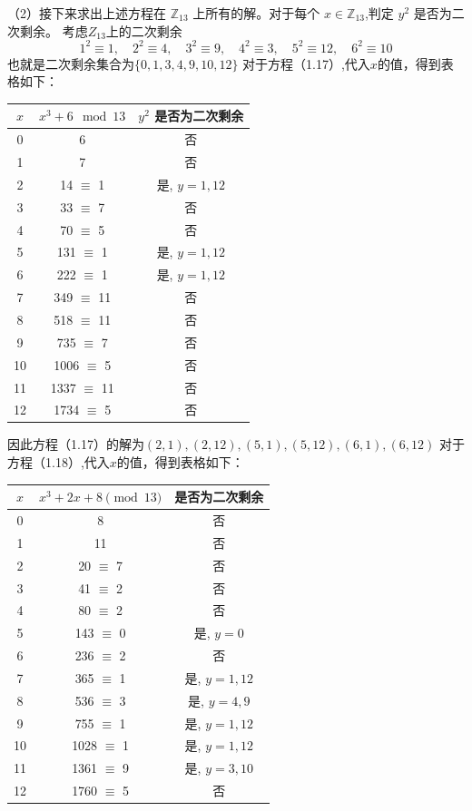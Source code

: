 \documentclass[12pt,a4paper]{article}
\begin{document}
（2）接下来求出上述方程在 $\mathbb{Z}_{13}$ 上所有的解。对于每个 $x \in \mathbb{Z}_{13}$,判定 $y^2$ 是否为二次剩余。
考虑\(Z_{13}\)上的二次剩余
\[
1^2 \equiv 1, \quad 2^2 \equiv 4, \quad 3^2 \equiv 9, \quad 4^2 \equiv 3, \quad 5^2 \equiv 12, \quad 6^2 \equiv 10
\]
也就是二次剩余集合为$\{0,1,3,4,9,10,12\}$
对于方程（1.17）,代入$x$的值，得到表格如下：
\begin{center}
\begin{tabular}{c|c|c}
$x$ & $x^3 + 6 \mod 13$ & $y^2$ 是否为二次剩余 \\
\hline
0 & 6 & 否 \\
1 & 7 & 否 \\
2 & 14 $\equiv$ 1 & 是, $y = 1, 12$ \\
3 & 33 $\equiv$ 7 & 否 \\
4 & 70 $\equiv$ 5 & 否 \\
5 & 131 $\equiv$ 1 & 是, $y = 1, 12$ \\
6 & 222 $\equiv$ 1 & 是, $y = 1, 12$ \\
7 & 349 $\equiv$ 11 & 否 \\
8 & 518 $\equiv$ 11 & 否 \\
9 & 735 $\equiv$ 7 & 否 \\
10 & 1006 $\equiv$ 5 & 否 \\
11 & 1337 $\equiv$ 11 & 否 \\
12 & 1734 $\equiv$ 5 & 否 \\
\end{tabular}
\end{center}
因此方程（1.17）的解为$(2,1),(2,12),(5,1),(5,12),(6,1),(6,12)$
对于方程（1.18）,代入$x$的值，得到表格如下：

\begin{center}
\begin{tabular}{c|c|c}
$x$ & $x^3 + 2x + 8 \pmod{13}$ & 是否为二次剩余 \\
\hline
0 & 8 & 否 \\
1 & 11 & 否 \\
2 & 20 $\equiv$ 7 & 否 \\
3 & 41 $\equiv$ 2 & 否 \\
4 & 80 $\equiv$ 2 & 否 \\
5 & 143 $\equiv$ 0 & 是, $y = 0$ \\
6 & 236 $\equiv$ 2 & 否 \\
7 & 365 $\equiv$ 1 & 是, $y = 1, 12$ \\
8 & 536 $\equiv$ 3 & 是, $y = 4, 9$ \\
9 & 755 $\equiv$ 1 & 是, $y = 1, 12$ \\
10 & 1028 $\equiv$ 1 & 是, $y = 1, 12$ \\
11 & 1361 $\equiv$ 9 & 是, $y = 3, 10$ \\
12 & 1760 $\equiv$ 5 & 否 \\
\end{tabular}
\end{center}
\end{document}
